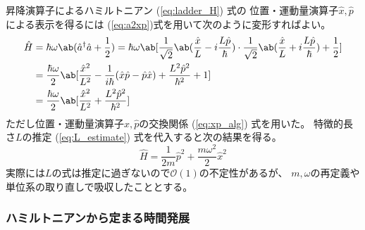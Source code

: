 昇降演算子によるハミルトニアン (\ref{eq:ladder_H}) 式の
位置・運動量演算子$\hat{x},\hat{p}$による表示を得るには
(\ref{eq:a2xp})式を用いて次のように変形すればよい。
\begin{equation}
  \begin{split}
    \hat{H}
    &=\hbar\omega\ab(\hat{a}^\dagger\hat{a}+\frac{1}{2})
    =\hbar\omega\ab[
      \frac{1}{\sqrt{2}}
      \ab(\frac{\hat{x}}{L}-i\frac{L\hat{p}}{\hbar})
      \cdot
      \frac{1}{\sqrt{2}}
      \ab(\frac{\hat{x}}{L}+i\frac{L\hat{p}}{\hbar})
      +\frac{1}{2}
    ] \\
    &=\frac{\hbar\omega}{2}\ab[
      \frac{\hat{x}^2}{L^2}
      -\frac{1}{i\hbar}(\hat{x}\hat{p}-\hat{p}\hat{x})
      +\frac{L^2\hat{p}^2}{\hbar^2}
      +1
    ] \\
    &=\frac{\hbar\omega}{2}\ab[
      \frac{\hat{x}^2}{L^2}
      +\frac{L^2\hat{p}^2}{\hbar^2}
    ]
  \end{split}
\end{equation}
ただし位置・運動量演算子$\hat{x},\hat{p}$の交換関係 (\ref{eq:xp_alg}) 式を用いた。
特徴的長さ$L$の推定 (\ref{eq:L_estimate}) 式を代入すると次の結果を得る。
\begin{equation}
  \label{eq:H_xp}
  \hat{H}=\frac{1}{2m}\hat{p}^2+\frac{m\omega^2}{2}\hat{x}^2
  \tag{9.4}
\end{equation}
実際には$L$の式は推定に過ぎないので$\mathcal{O}(1)$の不定性があるが、
$m,\omega$の再定義や単位系の取り直しで吸収したこととする。

\subsubsection{ハミルトニアンから定まる時間発展}


